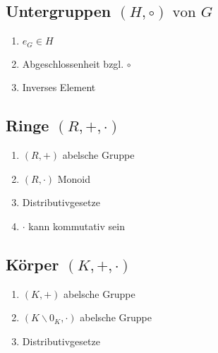 \documentclass[ngerman,11pt,a4paper
,pdftex]{article}
\newcommand{\f}[1]{$#1$}
\theoremstyle{nodot}
\theoremstyle{nodot}
\begin{document}
\begin{multicols*}{3}
\begin{tcolorbox}[colback=white,bottom=10pt, top=10pt,bottom=10pt, top=10pt]
            \subsection*{Untergruppen \f{(H,\circ) \text{ von } G}}
            \begin{enumerate}
              \item \f{e_G\in H}
              \item Abgeschlossenheit bzgl. \f{\circ}
              \item Inverses Element
            \end{enumerate}
          \end{tcolorbox}
          
          \begin{tcolorbox}[colback=white,bottom=10pt, top=10pt]
            \subsection*{Ringe \f{(R,+, \cdot)}}
            \begin{enumerate}
              \item \f{(R,+)} abelsche Gruppe
              \item \f{(R,\cdot)} Monoid
              \item Distributivgesetze
              \item \f{\cdot} kann kommutativ sein
            \end{enumerate}
          \end{tcolorbox}

          \begin{tcolorbox}[colback=white,bottom=10pt, top=10pt]
            \subsection*{Körper \f{(K,+, \cdot)}}
            \begin{enumerate}
              \item \f{(K,+)} abelsche Gruppe
              \item \f{(K\backslash 0_K,\cdot)} abelsche Gruppe
              \item Distributivgesetze
            \end{enumerate}
          \end{tcolorbox}

          \begin{tcolorbox}[colback=white,bottom=10pt, top=10pt]

\end{tcolorbox}
\end{multicols*}
\end{document}
